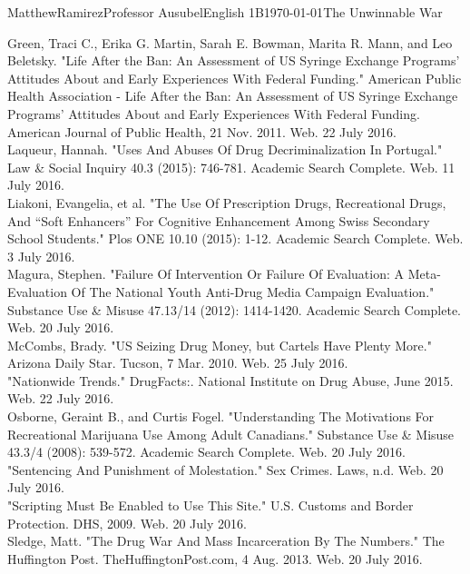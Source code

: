 \documentclass[12pt,letterpaper]{article}
\begin{document}
\begin{mla}{Matthew}{Ramirez}{Professor Ausubel}{English 1B}{\today}{The Unwinnable War}
\begin{workscited}
\bibent Green, Traci C., Erika G. Martin, Sarah E. Bowman, Marita R. Mann, and Leo Beletsky. "Life After the Ban: An Assessment of US Syringe Exchange Programs' Attitudes About and Early Experiences With Federal Funding." American Public Health Association - Life After the Ban: An Assessment of US Syringe Exchange Programs’ Attitudes About and Early Experiences With Federal Funding. American Journal of Public Health, 21 Nov. 2011. Web. 22 July 2016.\\
\bibent Laqueur, Hannah. "Uses And Abuses Of Drug Decriminalization In Portugal." Law \& Social Inquiry 40.3 (2015): 746-781. Academic Search Complete. Web. 11 July 2016.\\
\bibent Liakoni, Evangelia, et al. "The Use Of Prescription Drugs, Recreational Drugs, And “Soft Enhancers” For Cognitive Enhancement Among Swiss Secondary School Students." Plos ONE 10.10 (2015): 1-12. Academic Search Complete. Web. 3 July 2016.\\
\bibent Magura, Stephen. "Failure Of Intervention Or Failure Of Evaluation: A Meta-Evaluation Of The National Youth Anti-Drug Media Campaign Evaluation." Substance Use \& Misuse 47.13/14 (2012): 1414-1420. Academic Search Complete. Web. 20 July 2016.\\
\bibent McCombs, Brady. "US Seizing Drug Money, but Cartels Have Plenty More." Arizona Daily Star. Tucson, 7 Mar. 2010. Web. 25 July 2016.\\
\bibent "Nationwide Trends." DrugFacts:. National Institute on Drug Abuse, June 2015. Web. 22 July 2016.\\
\bibent Osborne, Geraint B., and Curtis Fogel. "Understanding The Motivations For Recreational Marijuana Use Among Adult Canadians." Substance Use \& Misuse 43.3/4 (2008): 539-572. Academic Search Complete. Web. 20 July 2016.\\
\bibent "Sentencing And Punishment of Molestation." Sex Crimes. Laws, n.d. Web. 20 July 2016.\\
\bibent "Scripting Must Be Enabled to Use This Site." U.S. Customs and Border Protection. DHS, 2009. Web. 20 July 2016.\\
\bibent Sledge, Matt. "The Drug War And Mass Incarceration By The Numbers." The Huffington Post. TheHuffingtonPost.com, 4 Aug. 2013. Web. 20 July 2016.\\
\end{workscited}
\end{mla}
\end{document}
